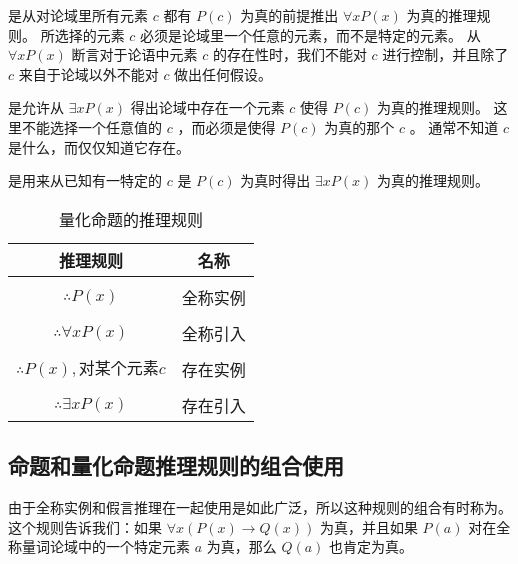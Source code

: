 {{        是从对论域里所有元素 $c$ 都有 $P(c)$ 为真的前提推出 $\forall x P(x)$ 为真的推理规则。
        所选择的元素 $c$ 必须是论域里一个任意的元素，而不是特定的元素。
        从 $\forall x P(x)$ 断言对于论语中元素 $c$ 的存在性时，我们不能对 $c$ 进行控制，并且除了 $c$ 来自于论域以外不能对 $c$ 做出任何假设。

        是允许从 $\exists x P(x)$ 得出论域中存在一个元素 $c$ 使得 $P(c)$ 为真的推理规则。
        这里不能选择一个任意值的 $c$ ，而必须是使得 $P(c)$ 为真的那个 $c$ 。
        通常不知道 $c$ 是什么，而仅仅知道它存在。

        是用来从已知有一特定的 $c$ 是 $P(c)$ 为真时得出 $\exists x P(x)$ 为真的推理规则。

        \begin{table}[htb]
            \centering

            \begin{tabular}{c|c}
                \hline
                推理规则 & 名称 \\
                \hline
                \makecell{$\underline{\forall x P(x)}$ \\ $\therefore P(x)$} & 全称实例 \\
                \hline
                \makecell{$\underline{P(c), \text{任意}c}$ \\ $\therefore \forall x P(x)$} & 全称引入 \\
                \hline
                \makecell{$\underline{\exists x P(x)}$ \\ $\therefore P(x), \text{对某个元素}c$} & 存在实例 \\
                \hline
                \makecell{$\underline{P(x), \text{对某个元素}c}$ \\ $\therefore \exists x P(x)$} & 存在引入 \\
                \hline
            \end{tabular}

            \caption{量化命题的推理规则}
        \end{table}
    }

    \subsection{命题和量化命题推理规则的组合使用}
    {
        由于全称实例和假言推理在一起使用是如此广泛，所以这种规则的组合有时称为。
        这个规则告诉我们：如果 $\forall x (P(x) \rightarrow Q(x))$ 为真，并且如果 $P(a)$ 对在全称量词论域中的一个特定元素 $a$ 为真，那么 $Q(a)$ 也肯定为真。

}}
